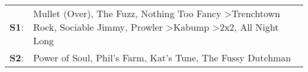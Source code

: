 \begin{supertabular}{p{0.03\textwidth}p{0.92\textwidth}}
 \textbf{S1}:  &  Mullet (Over)\textsuperscript{}, \enspace The Fuzz\textsuperscript{}, \enspace Nothing Too Fancy\textsuperscript{} \textgreater \enspace Trenchtown Rock\textsuperscript{}, \enspace Sociable Jimmy\textsuperscript{}, \enspace Prowler\textsuperscript{} \textgreater \enspace Kabump\textsuperscript{} \textgreater \enspace 2x2\textsuperscript{}, \enspace All Night Long\textsuperscript{}  \enspace  \\
 \textbf{S2}:  &                                                                                                                                                                                                                                    Power of Soul\textsuperscript{}, \enspace Phil's Farm\textsuperscript{}, \enspace Kat's Tune\textsuperscript{}, \enspace The Fussy Dutchman\textsuperscript{}  \enspace  \\
\end{supertabular}
